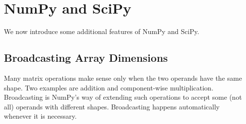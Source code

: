 \section*{NumPy and SciPy}
We now introduce some additional features of NumPy and SciPy.

\subsection*{Broadcasting Array Dimensions}
Many matrix operations make sense only when the two operands have the same shape. Two examples are addition and component-wise multiplication. Broadcasting is NumPy's way of extending such operations to accept some (not all) operands with different shapes. Broadcasting happens automatically whenever it is necessary. 

